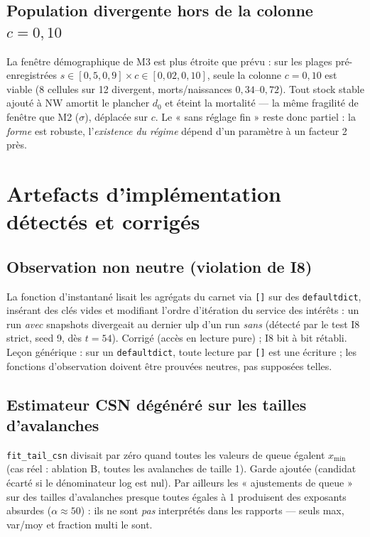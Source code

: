 \documentclass[11pt,a4paper]{article}
\newcommand{\NW}{\mathrm{NW}}
\newcommand{\code}[1]{\texttt{#1}}
\begin{document}
\subsection{Population divergente hors de la colonne $c = 0{,}10$}
La fenêtre démographique de M3 est plus étroite que prévu : sur les plages
pré-enregistrées $s \in [0{,}5, 0{,}9] \times c \in [0{,}02, 0{,}10]$, seule
la colonne $c = 0{,}10$ est viable (8 cellules sur 12 divergent,
morts/naissances $0{,}34$--$0{,}72$). Tout stock stable ajouté à $\NW$
amortit le plancher $d_0$ et éteint la mortalité — la même fragilité de
fenêtre que M2 ($\sigma$), déplacée sur $c$. Le « sans réglage fin » reste
donc partiel : la \emph{forme} est robuste, l'\emph{existence du régime}
dépend d'un paramètre à un facteur 2 près.

\section{Artefacts d'implémentation détectés et corrigés}

\subsection{Observation non neutre (violation de I8)}
La fonction d'instantané lisait les agrégats du carnet via \code{[]} sur des
\code{defaultdict}, insérant des clés vides et modifiant l'ordre d'itération
du service des intérêts : un run \emph{avec} snapshots divergeait au dernier
ulp d'un run \emph{sans} (détecté par le test I8 strict, seed 9, dès
$t = 54$). Corrigé (accès en lecture pure) ; I8 bit à bit rétabli. Leçon
générique : sur un \code{defaultdict}, toute lecture par \code{[]} est une
écriture ; les fonctions d'observation doivent être prouvées neutres, pas
supposées telles.

\subsection{Estimateur CSN dégénéré sur les tailles d'avalanches}
\code{fit\_tail\_csn} divisait par zéro quand toutes les valeurs de queue
égalent $x_{\min}$ (cas réel : ablation B, toutes les avalanches de taille
1). Garde ajoutée (candidat écarté si le dénominateur log est nul). Par
ailleurs les « ajustements de queue » sur des tailles d'avalanches presque
toutes égales à 1 produisent des exposants absurdes ($\alpha \approx 50$) :
ils ne sont \emph{pas} interprétés dans les rapports — seuls max, var/moy et
fraction multi le sont.
\end{document}
